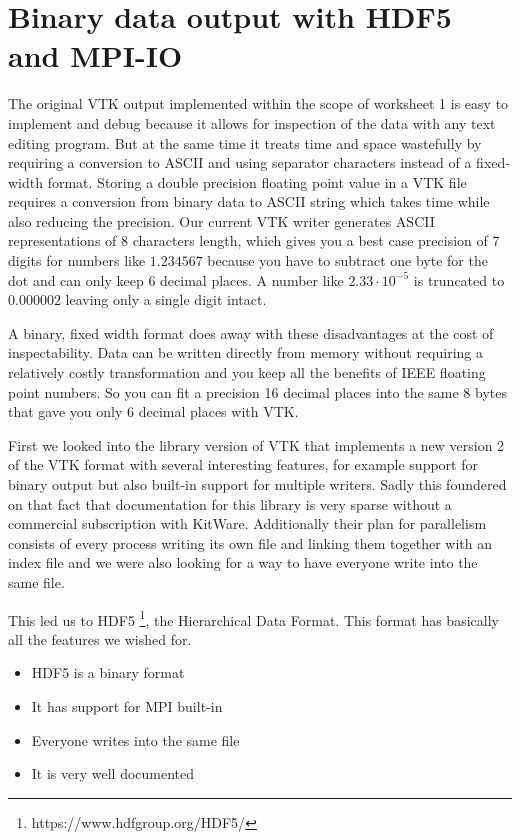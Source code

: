 \chapter{Binary data output with HDF5 and MPI-IO}
\label{cha:hdf5}

The original VTK output implemented within the scope of worksheet 1 is easy to
implement and debug because it allows for inspection of the data with any text
editing program. But at the same time it treats time and space wastefully by
requiring a conversion to ASCII and using separator characters instead of a
fixed-width format. Storing a double precision floating point value in a VTK
file requires a conversion from binary data to ASCII string which takes time
while also reducing the precision. Our current VTK writer generates ASCII
representations of 8 characters length, which gives you a best case precision of
7 digits for numbers like $1.234567$ because you have to subtract one byte for
the dot and can only keep 6 decimal places. A number like $2.33 \cdot 10^{-5}$
is truncated to $0.000002$ leaving only a single digit intact.

A binary, fixed width format does away with these disadvantages at the cost of
inspectability. Data can be written directly from memory without requiring a
relatively costly transformation and you keep all the benefits of IEEE floating
point numbers. So you can fit a precision 16 decimal places into the same 8
bytes that gave you only 6 decimal places with VTK.

First we looked into the library version of VTK that implements a new version 2
of the VTK format with several interesting features, for example support for
binary output but also built-in support for multiple writers. Sadly this
foundered on that fact that documentation for this library is very sparse
without a commercial subscription with KitWare. Additionally their plan for
parallelism consists of every process writing its own file and linking them
together with an index file and we were also looking for a way to have everyone
write into the same file.

This led us to HDF5 \footnote{https://www.hdfgroup.org/HDF5/}, the Hierarchical
Data Format. This format has basically all the features we wished for.

\begin{itemize}
\item HDF5 is a binary format
\item It has support for MPI built-in
\item Everyone writes into the same file
\item It is very well documented
\end{itemize}

